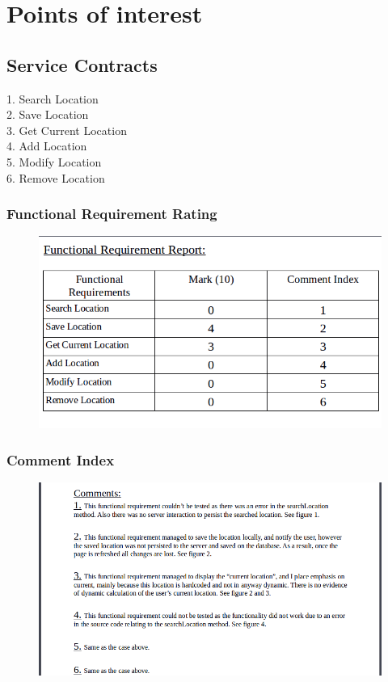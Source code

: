 \documentclass[english]{article}
\begin{document}
\section{Points of interest}
\subsection{Service Contracts}
1. Search Location\\
2. Save Location\\
3. Get Current Location\\
4. Add Location\\
5. Modify Location\\
6. Remove Location\\
\subsubsection{Functional Requirement Rating}
\begin{figure}[H]
\hspace*{-2.5cm}
\includegraphics[width=180mm]{mark-tbl-poi.png}
\end{figure}
\subsubsection{Comment Index}
\begin{figure}[H]
\hspace*{-2.5cm}
\includegraphics[width=180mm]{comments-poi.png}
\end{figure}
\end{document}
